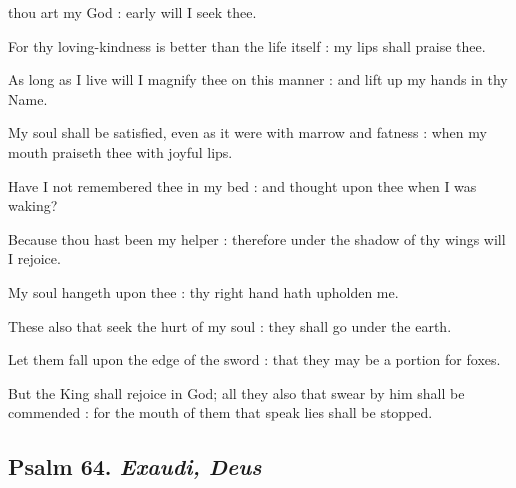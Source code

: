  thou art my God : early will I seek thee.\par
{}
For thy loving-kindness is better than the life itself : my lips shall praise thee.\par
{}As long as I live will I magnify thee on this manner : and lift up my hands in thy Name.\par
{}My soul shall be satisfied, even as it were with marrow and fatness : when my mouth praiseth thee with joyful lips.\par
{}Have I not remembered thee in my bed : and thought upon thee when I was waking?\par
{}Because thou hast been my helper : therefore under the shadow of thy wings will I rejoice.\par
{}My soul hangeth upon thee : thy right hand hath upholden me.\par
{}These also that seek the hurt of my soul : they shall go under the earth.\par
{}Let them fall upon the edge of the sword : that they may be a portion for foxes.\par
{}But the King shall rejoice in God; all they also that swear by him shall be commended : for the mouth of them that speak lies shall be stopped.\par

\subsection{Psalm 64. \textit{Exaudi, Deus}}

